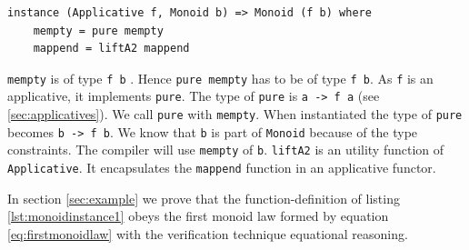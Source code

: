 \lstset{
basicstyle=\ttfamily,
columns=fullflexible,
keepspaces=true,
}
\begin{lstlisting}[caption={Monoid instance implementation of applicatives},label={lst:monoidinstance1}]
instance (Applicative f, Monoid b) => Monoid (f b) where
    mempty = pure mempty
    mappend = liftA2 mappend
\end{lstlisting}

\verb|mempty| is of type \verb|f b| . Hence \verb|pure mempty| has to be of type \verb|f b|.
As \verb|f| is an applicative, it implements \verb|pure|. The type of \verb|pure| is \verb|a -> f a| (see \ref{sec:applicatives}). We call \verb|pure| with \verb|mempty|. When instantiated the type of \verb|pure| becomes \verb|b -> f b|.  We know that \verb|b| is part of \verb|Monoid| because of the type constraints. The compiler will use \verb|mempty| of \verb|b|.  \verb|liftA2| is an utility function of \verb|Applicative|. It encapsulates the \verb|mappend| function in an applicative functor. 

In section \ref{sec:example} we prove that the \gls{function-definition} of listing \ref{lst:monoidinstance1} obeys the first monoid law formed by equation \ref{eq:firstmonoidlaw} with  the verification technique equational reasoning.


